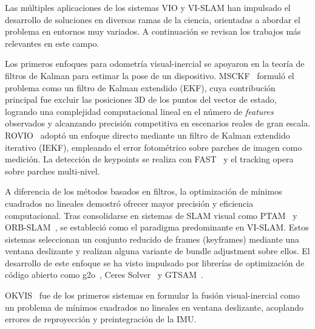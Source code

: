 Las múltiples aplicaciones de los sistemas VIO y VI-SLAM han impulsado el desarrollo de soluciones en diversas ramas de la ciencia, orientadas a abordar el problema en entornos muy variados. A continuación se revisan los trabajos más relevantes en este campo.

Los primeros enfoques para odometría visual-inercial se apoyaron en la teoría de filtros de Kalman para estimar la pose de un dispositivo. MSCKF~\cite{mourikis2007msckf} formuló el problema como un filtro de Kalman extendido (EKF), cuya contribución principal fue excluir las posiciones 3D de los puntos del vector de estado, logrando una complejidad computacional lineal en el número de \textit{features} observados y alcanzando precisión competitiva en escenarios reales de gran escala. ROVIO~\cite{bloesch2015rovio} adoptó un enfoque directo mediante un filtro de Kalman extendido iterativo (IEKF), empleando el error fotométrico sobre parches de imagen como medición. La detección de keypoints se realiza con FAST~\cite{rosten2006fast} y el tracking opera sobre parches multi-nivel.

A diferencia de los métodos basados en filtros, la optimización de mínimos cuadrados no lineales demostró ofrecer mayor precisión y eficiencia computacional. Tras consolidarse en sistemas de SLAM visual como PTAM~\cite{klein2007ptam} y ORB-SLAM~\cite{mur2015orbslam}, se estableció como el paradigma predominante en VI-SLAM. Estos sistemas seleccionan un conjunto reducido de frames (keyframes) mediante una ventana deslizante y realizan alguna variante de bundle adjustment sobre ellos. El desarrollo de este enfoque se ha visto impulsado por librerías de optimización de código abierto como g2o~\cite{kummerle2011g2o}, Ceres Solver~\cite{agarwal2023ceres} y GTSAM~\cite{dellaert2012gtsam}.

OKVIS~\cite{leutenegger2015okvis} fue de los primeros sistemas en formular la fusión visual-inercial como un problema de mínimos cuadrados no lineales en ventana deslizante, acoplando errores de reproyección y preintegración de la IMU.

